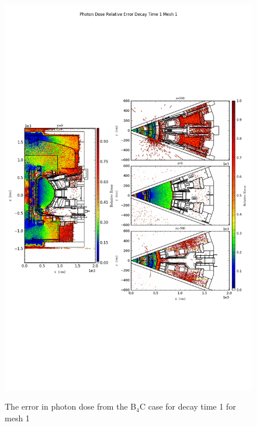 \begin{figure}[ht!]
\centering
\includegraphics[trim={0cm 9cm 0cm 10cm},clip,scale=0.75]{../plots/final_model_with_b4c/Photon_Dose_Relative_Error_Decay_Time_1_Mesh_1.png}
\label{fig:photons_dc1_no4bc_m1_error}
\caption{The error in photon dose from the B$_4$C case for decay time 1 for mesh 1}
\end{figure}
